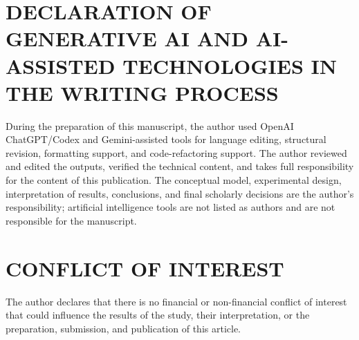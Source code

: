 \section*{DECLARATION OF GENERATIVE AI AND AI-ASSISTED TECHNOLOGIES IN THE WRITING PROCESS}

During the preparation of this manuscript, the author used OpenAI ChatGPT/Codex and Gemini-assisted tools for language editing, structural revision, formatting support, and code-refactoring support. The author reviewed and edited the outputs, verified the technical content, and takes full responsibility for the content of this publication. The conceptual model, experimental design, interpretation of results, conclusions, and final scholarly decisions are the author's responsibility; artificial intelligence tools are not listed as authors and are not responsible for the manuscript.

\section*{CONFLICT OF INTEREST}

The author declares that there is no financial or non-financial conflict of interest that could influence the results of the study, their interpretation, or the preparation, submission, and publication of this article.
